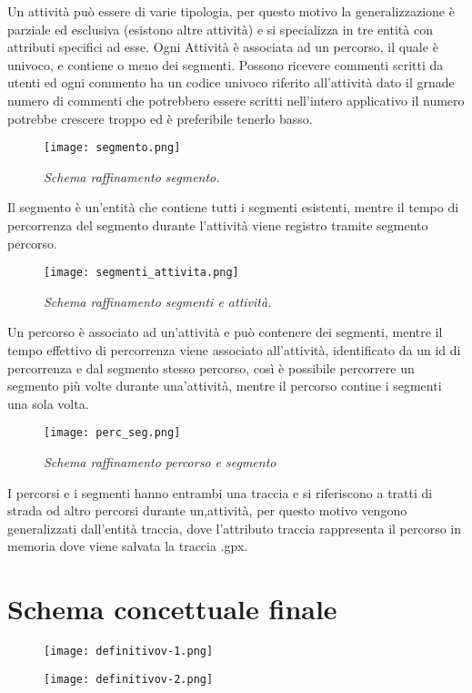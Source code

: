 \documentclass[12pt]{report}
\begin{document}
Un attività può essere di varie tipologia, per questo motivo la generalizzazione è 
parziale ed esclusiva (esistono altre attività) e si specializza in tre entità con attributi 
specifici ad esse. Ogni Attività è associata ad un percorso, il quale è univoco, e contiene
o meno dei segmenti. Possono ricevere commenti scritti da utenti ed ogni commento ha un codice
univoco riferito all'attività dato il grnade numero di commenti che potrebbero essere scritti
nell'intero applicativo il numero potrebbe crescere troppo ed è preferibile tenerlo basso.

\begin{figure}[H]
    \texttt{[image: segmento.png]}
    \centering
    \caption{\emph{Schema raffinamento segmento.}}
    \label{img:schema_segmento}
\end{figure}

Il segmento è un'entità che contiene tutti i segmenti esistenti, mentre il tempo di percorrenza
del segmento durante l'attività viene registro tramite segmento percorso. 

\begin{figure}[H]
    \texttt{[image: segmenti\_attivita.png]}
    \centering
    \caption{\emph{Schema raffinamento segmenti e attività.}}
    \label{img:schema_seg_att}
\end{figure}

Un percorso è associato ad un'attività e può contenere dei segmenti, mentre il tempo effettivo
di percorrenza viene associato all'attività, identificato da un id di percorrenza
e dal segmento stesso percorso, così è possibile percorrere un segmento più volte durante una'attività,
mentre il percorso contine i segmenti una sola volta. 

\begin{figure}[H]
    \texttt{[image: perc\_seg.png]}
    \centering
    \caption{\emph{Schema raffinamento percorso e segmento}}
    \label{img:schema_perc_seg}
\end{figure}

I percorsi e i segmenti hanno entrambi una traccia e si riferiscono a tratti di strada od altro percorsi
durante un,attività, per questo motivo vengono generalizzati dall'entità traccia, dove l'attributo traccia
rappresenta il percorso in memoria dove viene salvata la traccia .gpx.


\section{Schema concettuale finale}

    \begin{figure}[p]
        \centering
        \texttt{[image: definitivov-1.png]}
        
    \end{figure}
    
    \begin{figure}[p]
        \centering
        \texttt{[image: definitivov-2.png]}
    \end{figure}
    
\restoregeometry
\end{document}
